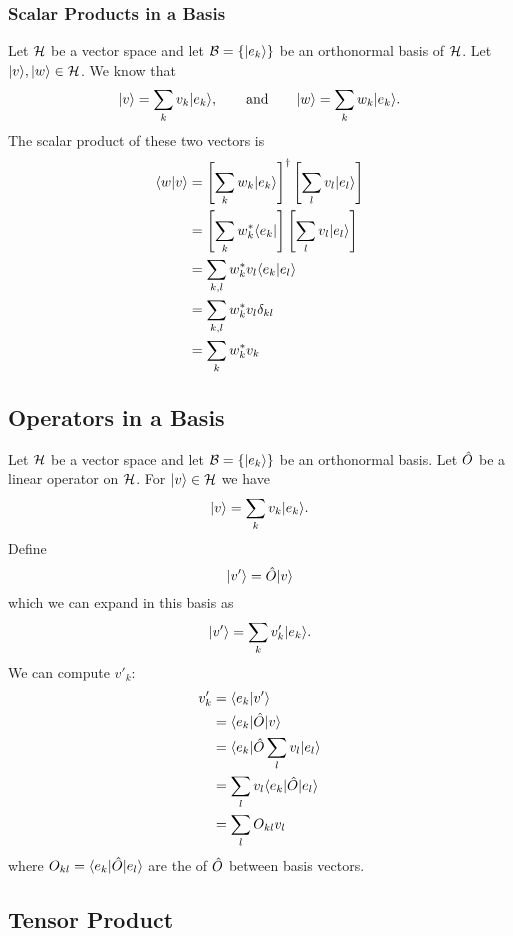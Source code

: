     \subsubsection{Scalar Products in a Basis}
    Let \(\mathcal{H}\) be a vector space and let \(\mathcal{B} = \{\vert {e_k} \rangle\}\) be an orthonormal basis of \(\mathcal{H}\).
    Let \(\vert {v} \rangle, \vert {w} \rangle\in\mathcal{H}\).
    We know that
    \[\vert {v} \rangle = \sum_k v_k\vert {e_k} \rangle, \qquad\text{and}\qquad \vert {w} \rangle = \sum_k w_k\vert {e_k} \rangle.\]
    The scalar product of these two vectors is
    \begin{align*}
        \langle {w} \vert {v} \rangle &= \left[\sum_k w_k\vert {e_k} \rangle\right]^\dagger \left[\sum_l v_l\vert {e_l} \rangle\right]\\
        &= \left[\sum_k w_k^*\langle {e_k} \vert\right] \left[\sum_l v_l\vert {e_l} \rangle\right]\\
        &= \sum_{k, l} w_k^*v_l\langle {e_k} \vert {e_l} \rangle\\
        &= \sum_{k, l} w_k^*v_l\delta_{kl}\\
        &= \sum_k w_k^*v_k
    \end{align*}
    
    \subsection{Operators in a Basis}
    Let \(\mathcal{H}\) be a vector space and let \(\mathcal{B} = \{\vert {e_k} \rangle\}\) be an orthonormal basis.
    Let \(\hat{O}\) be a linear operator on \(\mathcal{H}\).
    For \(\vert {v} \rangle\in\mathcal{H}\) we have
    \[\vert {v} \rangle = \sum_k v_k\vert {e_k} \rangle.\]
    Define
    \[\vert {v'} \rangle = \hat{O}\vert {v} \rangle\]
    which we can expand in this basis as
    \[\vert {v'} \rangle = \sum_k v'_k\vert {e_k} \rangle.\]
    We can compute \(v'_k\):
    \begin{align*}
        v'_k &= \langle {e_k} \vert {v'} \rangle\\
        &= \langle {e_k} \vert\hat{O}\vert {v} \rangle\\
        &= \langle {e_k} \vert\hat{O}\sum_l v_l\vert {e_l} \rangle\\
        &= \sum_l v_l\langle {e_k} \vert\hat{O}\vert {e_l} \rangle\\
        &= \sum_l O_{kl}v_l
    \end{align*}
    where \(O_{kl} = \langle {e_k} \vert\hat{O}\vert {e_l} \rangle\) are the  of \(\hat{O}\) between basis vectors.
    
    \subsection{Tensor Product}
